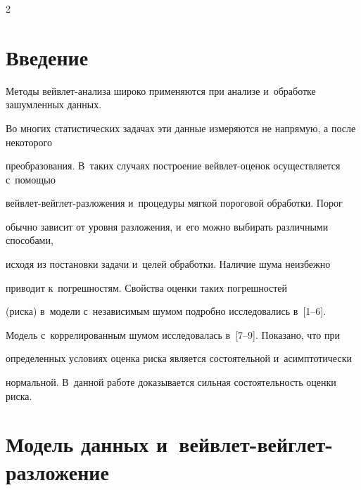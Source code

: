 \begin{multicols}{2}



\label{st\stat}





\section{Введение}



 \vspace*{-4pt}



Методы вейвлет-анализа широко применяются при анализе и~обработке зашумленных данных. 

Во многих статистических задачах эти данные измеряются не напрямую, а после некоторого 

преобразования. В~таких случаях построение вейв\-лет-оце\-нок осуществляется с~по\-мощью 

вейв\-лет-вейг\-лет-раз\-ло\-же\-ния и~процедуры мягкой пороговой обработки. Порог 

обычно зависит от уровня разложения, и~его можно выбирать различными способами,

 исходя из постановки задачи и~целей обработки. Наличие шума неизбежно 

 приводит к~погрешностям. Свойства оценки таких погрешностей 

 (риска) в~модели с~независимым шумом подробно исследовались в~[1--6]. 

 Модель с~коррелированным шумом исследовалась в~[7--9]. Показано, что при 

 определенных условиях оценка риска является состоятельной и~асимптотически 

 нормальной. В~данной работе доказывается сильная состоятельность оценки риска.

 

 \vspace*{-6pt}



\section{Модель данных и~вейвлет-вейглет-разложение}



 \vspace*{-4pt}




\end{multicols}
